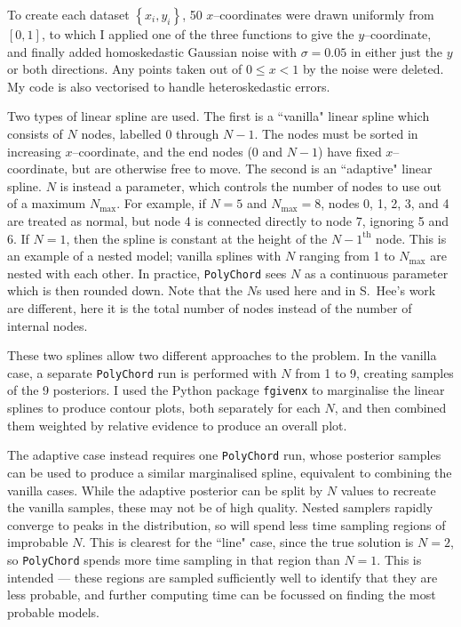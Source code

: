\documentclass{article}
\begin{document}
To create each dataset $\left\{x_i, y_i\right\}$, 50 $x$--coordinates were drawn uniformly from $\left[0, 1\right]$, to which I applied one of the three functions to give the $y$--coordinate, and finally added homoskedastic Gaussian noise with $\sigma = 0.05$ in either just the $y$ or both directions. Any points taken out of $0\leq x < 1$ by the noise were deleted. My code is also vectorised to handle heteroskedastic errors.

Two types of linear spline are used. The first is a ``vanilla" linear spline which consists of $N$ nodes, labelled $0$ through $N-1$. The nodes must be sorted in increasing $x$--coordinate, and the end nodes ($0$ and $N-1$) have fixed $x$--coordinate, but are otherwise free to move. The second is an ``adaptive" linear spline. $N$ is instead a parameter, which controls the number of nodes to use out of a maximum $N_\textrm{max}$. For example, if $N=5$ and $N_\textrm{max}=8$, nodes 0, 1, 2, 3, and 4 are treated as normal, but node 4 is connected directly to node 7, ignoring 5 and 6. If $N=1$, then the spline is constant at the height of the {$N-1^\textrm{th}$} node. This is an example of a nested model; vanilla splines with $N$ ranging from 1 to $N_\textrm{max}$ are nested with each other. In practice, \texttt{PolyChord} sees $N$ as a continuous parameter which is then rounded down. Note that the $N$s used here and in S.~Hee's work are different, here it is the total number of nodes instead of the number of internal nodes.

These two splines allow two different approaches to the problem. In the vanilla case, a separate \texttt{PolyChord} run is performed with $N$ from 1 to 9, creating samples of the 9 posteriors. I used the Python package \texttt{fgivenx} to marginalise the linear splines to produce contour plots, both separately for each $N$, and then combined them weighted by relative evidence to produce an overall plot.

The adaptive case instead requires one \texttt{PolyChord} run, whose posterior samples can be used to produce a similar marginalised spline, equivalent to combining the vanilla cases. While the adaptive posterior can be split by $N$ values to recreate the vanilla samples, these may not be of high quality. Nested samplers rapidly converge to peaks in the distribution, so will spend less time sampling regions of improbable $N$. This is clearest for the ``line" case, since the true solution is $N=2$, so \texttt{PolyChord} spends more time sampling in that region than $N=1$. This is intended --- these regions are sampled sufficiently well to identify that they are less probable, and further computing time can be focussed on finding the most probable models.
\end{document}
